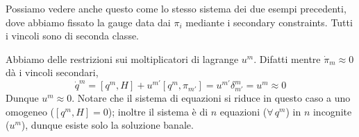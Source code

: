 \documentclass[a4paper, 11pt]{article}
\begin{document}
	Possiamo vedere anche questo come lo stesso sistema dei due esempi precedenti, dove abbiamo fissato la gauge data dai $\pi_i$ mediante i secondary constraints. Tutti i vincoli sono di seconda classe.
	
	Abbiamo delle restrizioni sui moltiplicatori di lagrange $u^m$. Difatti mentre $\dot{\pi}_m\approx 0$ dà i vincoli secondari,
	\[ \dot{q}^m = [q^m, H]+ u^{m'}[q^m, \pi_{m'}] = u^{m'} \delta_{m'}^m = u^m \approx 0\]
	Dunque $u^m \approx 0$. Notare che il sistema di equazioni si riduce in questo caso a uno omogeneo ($[q^m, H]=0$); inoltre il sistema è di $n$ equazioni ($\forall\,q^m$) in $n$ incognite ($u^m$), dunque esiste solo la soluzione banale.
	
\end{document}
